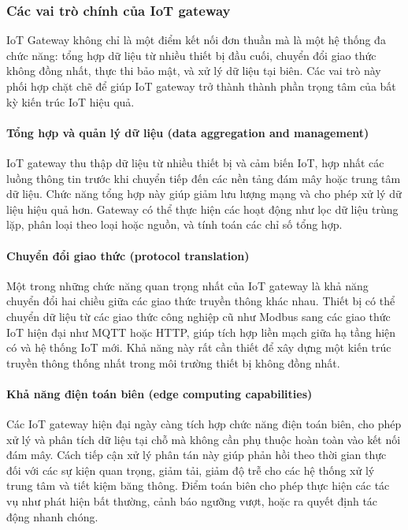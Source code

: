         \subsubsection{Các vai trò chính của IoT gateway}
            IoT Gateway không chỉ là một điểm kết nối đơn thuần mà là một hệ thống đa chức năng: tổng hợp dữ liệu từ nhiều thiết bị đầu cuối, chuyển đổi giao thức không đồng nhất, thực thi bảo mật, và xử lý dữ liệu tại biên. Các vai trò này phối hợp chặt chẽ để giúp IoT gateway trở thành thành phần trọng tâm của bất kỳ kiến trúc IoT hiệu quả.
                \paragraph{Tổng hợp và quản lý dữ liệu (data aggregation and management)}
                    IoT gateway thu thập dữ liệu từ nhiều thiết bị và cảm biến IoT, hợp nhất các luồng thông tin trước khi chuyển tiếp đến các nền tảng đám mây hoặc trung tâm dữ liệu. Chức năng tổng hợp này giúp giảm lưu lượng mạng và cho phép xử lý dữ liệu hiệu quả hơn. Gateway có thể thực hiện các hoạt động như lọc dữ liệu trùng lặp, phân loại theo loại hoặc nguồn, và tính toán các chỉ số tổng hợp.

                \paragraph{Chuyển đổi giao thức (protocol translation)}
                    Một trong những chức năng quan trọng nhất của IoT gateway là khả năng chuyển đổi hai chiều giữa các giao thức truyền thông khác nhau. Thiết bị có thể chuyển dữ liệu từ các giao thức công nghiệp cũ như Modbus sang các giao thức IoT hiện đại như MQTT hoặc HTTP, giúp tích hợp liền mạch giữa hạ tầng hiện có và hệ thống IoT mới. Khả năng này rất cần thiết để xây dựng một kiến trúc truyền thông thống nhất trong môi trường thiết bị không đồng nhất.

                \paragraph{Khả năng điện toán biên (edge computing capabilities)}
                    Các IoT gateway hiện đại ngày càng tích hợp chức năng điện toán biên, cho phép xử lý và phân tích dữ liệu tại chỗ mà không cần phụ thuộc hoàn toàn vào kết nối đám mây. Cách tiếp cận xử lý phân tán này giúp phản hồi theo thời gian thực đối với các sự kiện quan trọng, giảm tải, giảm độ trễ cho các hệ thống xử lý trung tâm và tiết kiệm băng thông. Điểm toán biên cho phép thực hiện các tác vụ như phát hiện bất thường, cảnh báo ngưỡng vượt, hoặc ra quyết định tác động nhanh chóng.

